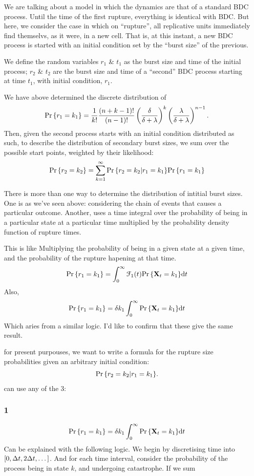We are talking about a model in which the dynamics are that of a standard BDC process. Until the time of the first rupture, everything is identical with BDC. But here, we consider the case in which on ``rupture'', all replicative units immediately find themselvs, as it were, in a new cell. That is, at this instant, a new BDC process is started with an initial condition set by the ``burst size'' of the previous. \par
We define the random variables $r_1$ \& $t_1$ as the burst size and time of the initial process; $r_2$ \& $t_2$ are the burst size and time of a ``second'' BDC process starting at time $t_1$, with initial condition, $r_1$.  \par
We have above determined the discrete distribution of 
$${\text{Pr}\left\{r_1 = k_1\right\}} =    \frac{1}{k!}\frac{(n+k-1)!}{(n-1)!}    \left(\frac{\delta}{\delta + \lambda}\right)^{k} \left(\frac{\lambda}{\delta + \lambda}\right)^{n-1}.$$
Then, given the second process starts with an initial condition distributed as such, to describe the distribution of secondary burst sizes, we sum over the possible start points, weighted by their likelihood:
$${\text{Pr}\left\{r_2 = k_2\right\}} = \sum_{k=1}^\infty {\text{Pr}\left\{r_2 = k_2 | r_1 = k_1\right\}}{\text{Pr}\left\{r_1 = k_1\right\}}$$


There is more than one way to determine the distribution of intitial burst sizes. One is as we've seen above: considering the chain of events that causes a particular outcome. Another, uses a time integral over the probability of being in a particular state at a particular time multiplied by the probability density function of rupture times. 

This is like Multiplying the probability of being in a given state at a given time, and the probability of the rupture hapening at that time. 
$${\text{Pr}\left\{r_1 = k_1\right\}} = \int_0^{\infty}{\mathcal{F}_{1}(t){\text{Pr}\left\{{{\bf X}_t} = k_1\right\}}}{\rm d} t$$
Also,
$${\text{Pr}\left\{r_1 = k_1\right\}} = \delta k_1\int_0^{\infty}{{\text{Pr}\left\{{{\bf X}_t} = k_1\right\}}}{\rm d} t$$
Which aries from a similar logic. I'd like to confirm that these give the same result.\par
for present purpouses, we want to write a formula for the rupture size probabilities given an arbitrary initial condition:
$${\text{Pr}\left\{r_2 = k_2 | r_1 = k_1\right\}}.$$
can use any of the 3:




\subsubsection*{1}

$${\text{Pr}\left\{r_1 = k_1\right\}} = \delta k_1\int_0^{\infty}{{\text{Pr}\left\{{{\bf X}_t} = k_1\right\}}}{\rm d} t$$
Can be explained with the following logic. 
We begin by discretising time into $[0,\Delta t , 2 \Delta t , \dots]$. And for each time interval, consider the probability of the process being in state $k$, and undergoing catastrophe. If we sum 

